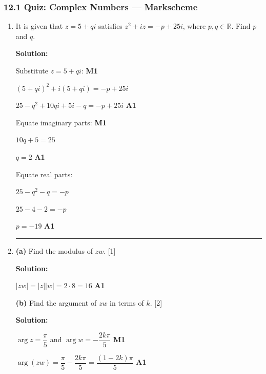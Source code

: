 \documentclass[12pt, twoside]{article}
\begin{document}
\subsubsection*{12.1 Quiz: Complex Numbers --- Markscheme}

\begin{enumerate}[itemsep=0.3cm]

\item[1.] 

It is given that $z = 5 + qi$ satisfies
$z^2 + iz = -p + 25i$, where $p, q \in \mathbb{R}$.
Find $p$ and $q$.

\textbf{Solution:}

Substitute $z = 5 + qi$: \hfill \textbf{M1}

$(5 + qi)^2 + i(5 + qi) = -p + 25i$

$25 - q^2 + 10qi + 5i - q = -p + 25i$ \hfill \textbf{A1}

Equate imaginary parts: \hfill \textbf{M1}

$10q + 5 = 25$

$q = 2$ \hfill \textbf{A1}

Equate real parts:

$25 - q^2 - q = -p$

$25 - 4 - 2 = -p$

$p = -19$ \hfill \textbf{A1}

\bigskip
\hrule
\bigskip

\item[2.] 

\textbf{(a)} Find the modulus of $zw$. \hfill [1]

\textbf{Solution:}

$|zw| = |z||w| = 2 \cdot 8 = 16$ \hfill \textbf{A1}

\medskip

\textbf{(b)} Find the argument of $zw$ in terms of $k$. \hfill [2]

\textbf{Solution:}

$\arg z = \dfrac{\pi}{5}$ and $\arg w = -\dfrac{2k\pi}{5}$ \hfill \textbf{M1}

$\arg(zw) = \dfrac{\pi}{5} - \dfrac{2k\pi}{5}
= \dfrac{(1 - 2k)\pi}{5}$ \hfill \textbf{A1}


\end{enumerate}
\end{document}
